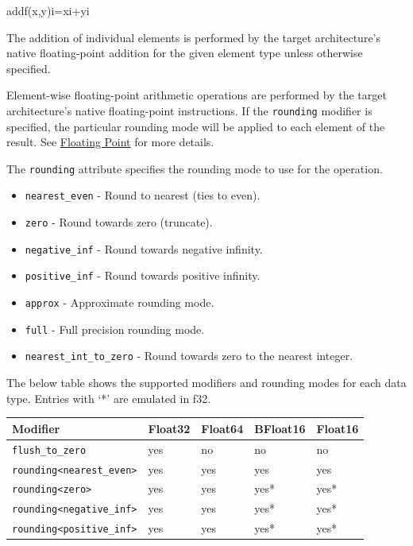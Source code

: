 \documentclass{article}
\begin{document}
addf(x,y)i=xi+yi

The addition of individual elements is performed by the target architecture's native floating-point addition for the given element type unless otherwise specified.


Element-wise floating-point arithmetic operations are performed by the target architecture's native floating-point instructions. If the \texttt{rounding} modifier is specified, the particular rounding mode will be applied to each element of the result. See \href{https://docs.nvidia.com/cuda/tile-ir/latest/sections/operations.html#op-group-floating-point}{Floating Point} for more details.


The \texttt{rounding} attribute specifies the rounding mode to use for the operation.


\begin{itemize}
\item \texttt{nearest\_even} - Round to nearest (ties to even).
\item \texttt{zero} - Round towards zero (truncate).
\item \texttt{negative\_inf} - Round towards negative infinity.
\item \texttt{positive\_inf} - Round towards positive infinity.
\item \texttt{approx} - Approximate rounding mode.
\item \texttt{full} - Full precision rounding mode.
\item \texttt{nearest\_int\_to\_zero} - Round towards zero to the nearest integer.

\end{itemize}
The below table shows the supported modifiers and rounding modes for each data type. Entries with `*' are emulated in f32.


\begin{longtable}{l|l|l|l|l}
\hline
Modifier & Float32 & Float64 & BFloat16 & Float16 \\ \hline
\texttt{flush\_to\_zero} & yes & no & no & no \\ \hline
\texttt{rounding<nearest\_even>} & yes & yes & yes & yes \\ \hline
\texttt{rounding<zero>} & yes & yes & yes* & yes* \\ \hline
\texttt{rounding<negative\_inf>} & yes & yes & yes* & yes* \\ \hline
\texttt{rounding<positive\_inf>} & yes & yes & yes* & yes* \\ \hline
\end{longtable}
\end{document}
